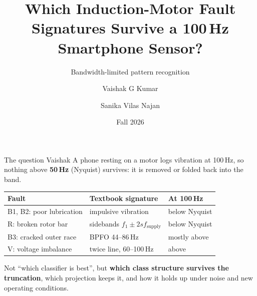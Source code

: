 \documentclass[aspectratio=169,11pt]{beamer}
\title{Which Induction-Motor Fault Signatures Survive a 100\,Hz Smartphone Sensor?}
\subtitle{Bandwidth-limited pattern recognition}
\author{Vaishak G Kumar \and Sanika Vilas Najan}
\institute{CSE 455/555, University at Buffalo}
\date{Fall 2026}
\newcommand{\who}[1]{\hfill{\footnotesize\color{gray}#1}}
\begin{document}
\begin{frame}
  \titlepage
\end{frame}

\begin{frame}{The question \who{Vaishak}}
  A phone resting on a motor logs vibration at 100\,Hz, so nothing above \textbf{50\,Hz}
  (Nyquist) survives: it is removed or folded back into the band.
  \vspace{0.6em}
  \begin{center}
  \begin{tabular}{lll}
    \toprule
    Fault & Textbook signature & At 100\,Hz \\
    \midrule
    B1, B2: poor lubrication & impulsive vibration & below Nyquist \\
    R: broken rotor bar & sidebands $f_1 \pm 2sf_\mathrm{supply}$ & below Nyquist \\
    B3: cracked outer race & BPFO 44--86\,Hz & mostly above \\
    V: voltage imbalance & twice line, 60--100\,Hz & above \\
    \bottomrule
  \end{tabular}
  \end{center}
  \vspace{0.6em}
  Not ``which classifier is best'', but \textbf{which class structure survives the
  truncation}, which projection keeps it, and how it holds up under noise and new operating
  conditions.
\end{frame}
\end{document}
